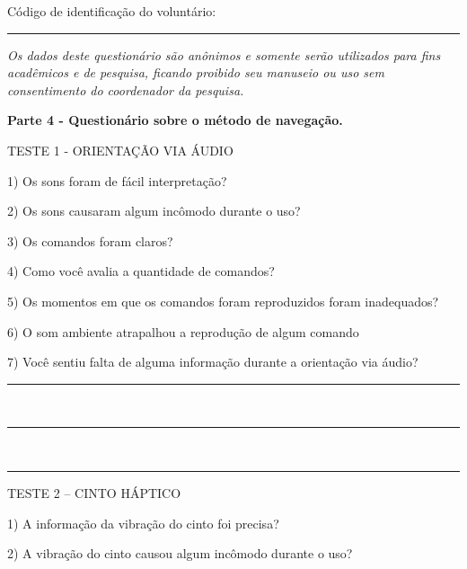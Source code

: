 {\color{gray}

Código de identificação do voluntário: \rule{1in}{.2mm}

\textit{Os dados deste questionário são anônimos e somente serão utilizados para fins acadêmicos e de pesquisa, ficando proibido seu manuseio ou uso sem consentimento do coordenador da pesquisa.}}

\begin{center}
\textbf{Parte 4 - Questionário sobre o método de navegação.}
\end{center}

{\large TESTE 1 - ORIENTAÇÃO VIA ÁUDIO}

1)	Os sons foram de fácil interpretação?



2)	Os sons causaram algum incômodo durante o uso?



3)	Os comandos foram claros?



4)	Como você avalia a quantidade de comandos?



5)	Os momentos em que os comandos foram reproduzidos foram inadequados?



6)	O som ambiente atrapalhou a reprodução de algum comando



7)	Você sentiu falta de alguma informação durante a orientação via áudio?

\noindent
\rule{6in}{.2mm} \\
\rule{6in}{.2mm} \\
\rule{6in}{.2mm}

\vspace{2cm}

{\large TESTE 2 – CINTO HÁPTICO}

1)	A informação da vibração do cinto foi precisa?



2)	A vibração do cinto causou algum incômodo durante o uso?



